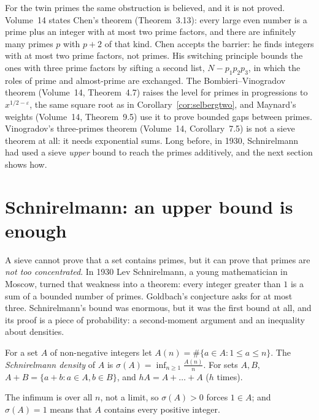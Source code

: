 For the twin primes the same obstruction is believed, and it is not proved. Volume~14 states Chen's theorem (Theorem~3.13): every large even number is a prime plus an integer with at most two prime factors, and there are infinitely many primes $p$ with $p+2$ of that kind. Chen accepts the barrier: he finds integers with at most two prime factors, not primes. His switching principle bounds the ones with three prime factors by sifting a second list, $N-p_1p_2p_3$, in which the roles of prime and almost-prime are exchanged. The Bombieri--Vinogradov theorem (Volume~14, Theorem~4.7) raises the level for primes in progressions to $x^{1/2-\varepsilon}$, the same square root as in Corollary~\ref{cor:selbergtwo}, and Maynard's weights (Volume~14, Theorem~9.5) use it to prove bounded gaps between primes. Vinogradov's three-primes theorem (Volume~14, Corollary~7.5) is not a sieve theorem at all: it needs exponential sums. Long before, in 1930, Schnirelmann had used a sieve \emph{upper} bound to reach the primes additively, and the next section shows how.

\section{Schnirelmann: an upper bound is enough}

A sieve cannot prove that a set contains primes, but it can prove that primes are \emph{not too concentrated}. In 1930 Lev Schnirelmann, a young mathematician in Moscow, turned that weakness into a theorem: every integer greater than $1$ is a sum of a bounded number of primes. Goldbach's conjecture asks for at most three. Schnirelmann's bound was enormous, but it was the first bound at all, and its proof is a piece of probability: a second-moment argument and an inequality about densities.

\begin{definition}\label{def:schnirelmann}
For a set $A$ of non-negative integers let $A(n)=\#\{a\in A:1\le a\le n\}$. The \emph{Schnirelmann density} of $A$ is $\sigma(A)=\inf_{n\ge1}\frac{A(n)}n$. For sets $A,B$, $A+B=\{a+b:a\in A,b\in B\}$, and $hA=A+\dots+A$ ($h$ times).
\end{definition}

The infimum is over all $n$, not a limit, so $\sigma(A)>0$ forces $1\in A$; and $\sigma(A)=1$ means that $A$ contains every positive integer.

